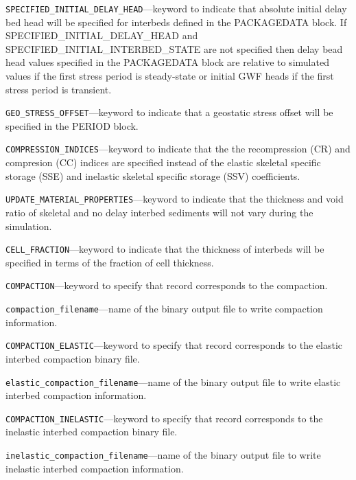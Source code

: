 \begin{description}
\item \texttt{SPECIFIED\_INITIAL\_DELAY\_HEAD}---keyword to indicate that absolute initial delay bed head will be specified for interbeds defined in the PACKAGEDATA block. If SPECIFIED\_INITIAL\_DELAY\_HEAD and SPECIFIED\_INITIAL\_INTERBED\_STATE are not specified then delay bead head values specified in the PACKAGEDATA block are relative to simulated values if the first stress period is steady-state or initial GWF heads if the first stress period is transient.

\item \texttt{GEO\_STRESS\_OFFSET}---keyword to indicate that a geostatic stress offset will be specified in the PERIOD block.

\item \texttt{COMPRESSION\_INDICES}---keyword to indicate that the the recompression (CR) and compresion (CC) indices are specified instead of the elastic skeletal specific storage (SSE) and inelastic skeletal specific storage (SSV) coefficients.

\item \texttt{UPDATE\_MATERIAL\_PROPERTIES}---keyword to indicate that the thickness and void ratio of skeletal and no delay interbed sediments will not vary during the simulation.

\item \texttt{CELL\_FRACTION}---keyword to indicate that the thickness of interbeds will be specified in terms of the fraction of cell thickness.

\item \texttt{COMPACTION}---keyword to specify that record corresponds to the compaction.

\item \texttt{compaction\_filename}---name of the binary output file to write compaction information.

\item \texttt{COMPACTION\_ELASTIC}---keyword to specify that record corresponds to the elastic interbed compaction binary file.

\item \texttt{elastic\_compaction\_filename}---name of the binary output file to write elastic interbed compaction information.

\item \texttt{COMPACTION\_INELASTIC}---keyword to specify that record corresponds to the inelastic interbed compaction binary file.

\item \texttt{inelastic\_compaction\_filename}---name of the binary output file to write inelastic interbed compaction information.


\end{description}
